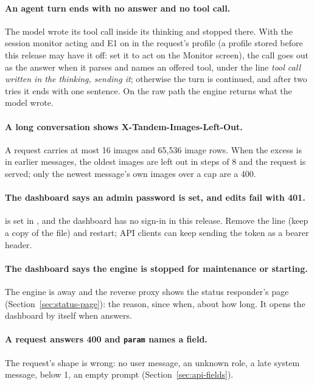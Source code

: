 \paragraph{An agent turn ends with no answer and no tool call.} The model wrote its tool call inside its thinking and stopped there. With the session monitor acting and E1 on in the request's profile (a profile stored before this release may have it off: set it to act on the Monitor screen), the call goes out as the answer when it parses and names an offered tool, under the line \emph{tool call written in the thinking, sending it}; otherwise the turn is continued, and after two tries it ends with one sentence. On the raw path the engine returns what the model wrote.

\paragraph{A long conversation shows X-Tandem-Images-Left-Out.} A request carries at most 16 images and 65,536 image rows. When the excess is in earlier messages, the oldest images are left out in steps of 8 and the request is served; only the newest message's own images over a cap are a 400.

\paragraph{The dashboard says an admin password is set, and edits fail with 401.}  is set in , and the dashboard has no sign-in in this release. Remove the line (keep a copy of the file) and restart; API clients can keep sending the token as a bearer header.

\paragraph{The dashboard says the engine is stopped for maintenance or starting.} The engine is away and the reverse proxy shows the status responder's page (Section~\ref{sec:status-page}): the reason, since when, about how long. It opens the dashboard by itself when  answers.

\paragraph{A request answers 400 and \texttt{param} names a field.} The request's shape is wrong: no user message, an unknown role, a late system message,  below 1, an empty prompt (Section~\ref{sec:api-fields}).

